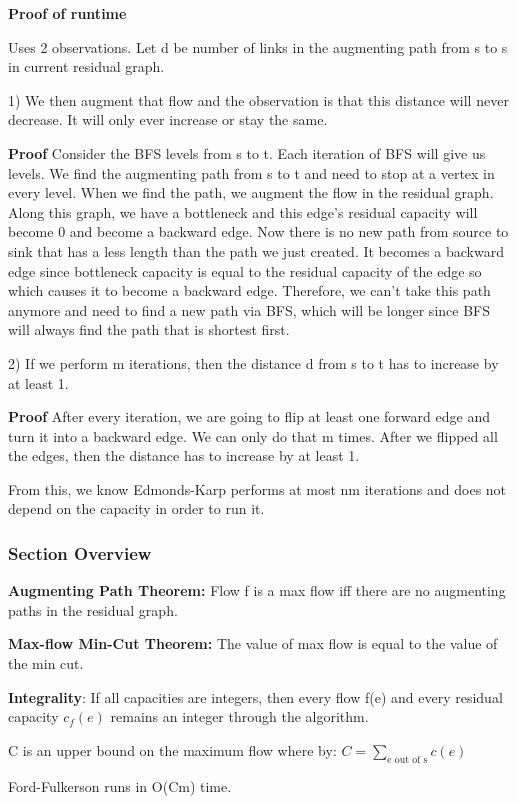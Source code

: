 \documentclass[11pt, oneside]{article}
\theoremstyle{definition}
\begin{document}
\textbf{Proof of runtime}

Uses 2 observations. Let d be number of links in the augmenting path from s to s in current residual graph.

1) We then augment that flow and the observation is that this distance will never decrease. It will only ever increase or stay the same.

\textbf{Proof}
Consider the BFS levels from s to t. Each iteration of BFS will give us levels. We find the augmenting path from s to t and need to stop at a vertex in every level. When we find the path, we augment the flow in the residual graph. Along this graph, we have a bottleneck and this edge's residual capacity will become 0 and become a backward edge. Now there is no new path from source to sink that has a less length than the path we just created. It becomes a backward edge since bottleneck capacity is equal to the residual capacity of the edge so which causes it to become a backward edge. Therefore, we can't take this path anymore and need to find a new path via BFS, which will be longer since BFS will always find the path that is shortest first.

2) If we perform m iterations, then the distance d from s to t has to increase by at least 1.

\textbf{Proof}
After every iteration, we are going to flip at least one forward edge and turn it into a backward edge. We can only do that m times. After we flipped all the edges, then the distance has to increase by at least 1.


From this, we know Edmonds-Karp performs at most nm iterations and does not depend on the capacity in order to run it.

\subsubsection{Section Overview}
\textbf{Augmenting Path Theorem:} Flow f is a max flow iff there are no augmenting paths in the residual graph.

\textbf{Max-flow Min-Cut Theorem:} The value of max flow is equal to the value of the min cut.

\textbf{Integrality}: If all capacities are integers, then every flow f(e) and every residual capacity $c_{f}(e)$ remains an integer through the algorithm.

C is an upper bound on the maximum flow where by: $C = \sum_{\text{e out of s}}c(e)$

Ford-Fulkerson runs in O(Cm) time.
\end{document}
